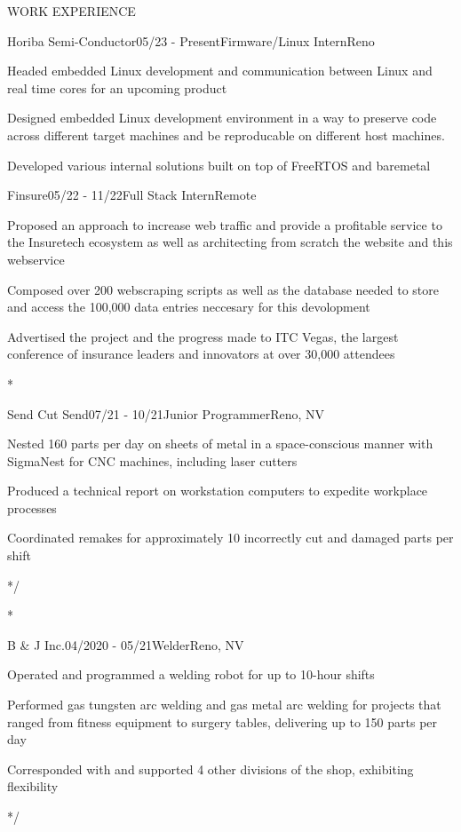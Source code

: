 \documentclass{resume} %
\begin{document}
\begin{rSection}{WORK EXPERIENCE}

	\begin{rSubsection}{Horiba Semi-Conductor}{05/23 - Present}{Firmware/Linux Intern}{Reno}
		\item Headed embedded Linux development and communication between Linux and real time cores for an upcoming product
		\item Designed embedded Linux development environment in a way to preserve code across different target machines and be reproducable on different host machines.
		\item Developed various internal solutions built on top of FreeRTOS and baremetal
	\end{rSubsection}

	\begin{rSubsection}{Finsure}{05/22 - 11/22}{Full Stack Intern}{Remote}
		\item Proposed an approach to increase web traffic and provide a profitable service to the Insuretech 
		ecosystem as well as architecting from scratch the website and this webservice
		\item Composed over 200 webscraping scripts as well as the database needed to store and access the 100,000 data entries neccesary for this devolopment
		\item Advertised the project and the progress made to ITC Vegas, the largest conference of insurance leaders and innovators at over 30,000 attendees
	\end{rSubsection}

	\/*
	\begin{emptyrSubsection}{Send Cut Send}{07/21 - 10/21}{Junior Programmer}{Reno, NV}
		\item Nested 160 parts per day on sheets of metal in a space-conscious manner with SigmaNest for CNC machines,
		including laser cutters
		\item Produced a technical report on workstation computers to expedite workplace processes
		\item Coordinated remakes for approximately 10 incorrectly cut and damaged parts per shift
	\end{emptyrSubsection}
	*/

	\/*
	\begin{rSubsection}{B \& J Inc.}{04/2020 - 05/21}{Welder}{Reno, NV}
		\item Operated and programmed a welding robot for up to 10-hour shifts
		\item Performed gas tungsten arc welding and gas metal arc welding for projects that ranged from fitness equipment to surgery tables, delivering up to 150 parts per day
		\item Corresponded with and supported 4 other divisions of the shop, exhibiting flexibility
	\end{rSubsection}
	*/


\end{rSection}
\end{document}
